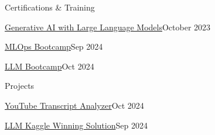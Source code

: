 \documentclass{resume} %
\begin{document}
\begin{rSection}{Certifications \& Training}
            \begin{rSubsection}
            {\href{https://coursera.org/share/9459a80d6710c6beebe8355a73b52368}{Generative AI with Large Language Models}}{October 2023}
            {}{}
                            \item %
                    \end{rSubsection}
            \begin{rSubsection}
            {\href{https://certificate.datatalks.club/mlops-zoomcamp/2024/55db812d19a5b355790d127cb88ca72afdc49df5.pdf}{MLOps Bootcamp}}{Sep 2024}
            {}{}
                            \item %
                    \end{rSubsection}
            \begin{rSubsection}
            {\href{https://certificate.datatalks.club/llm-zoomcamp/2024/55db812d19a5b355790d127cb88ca72afdc49df5.pdf}{LLM Bootcamp}}{Oct 2024}
            {}{}
                            \item %
                    \end{rSubsection}
    \end{rSection}

\begin{rSection}{Projects}
            \begin{rSubsection}
            {\href{https://github.com/ArturGR3/Youtube-transcript-Q-A}{YouTube Transcript Analyzer}}{Oct 2024}{}{}
                            \item %
                    \end{rSubsection}
            \begin{rSubsection}
            {\href{https://github.com/ArturGR3/LLM-kaggle-competition}{LLM Kaggle Winning Solution}}{Sep 2024}{}{}
                            \item %
                    \end{rSubsection}
    \end{rSection}
\end{document}
